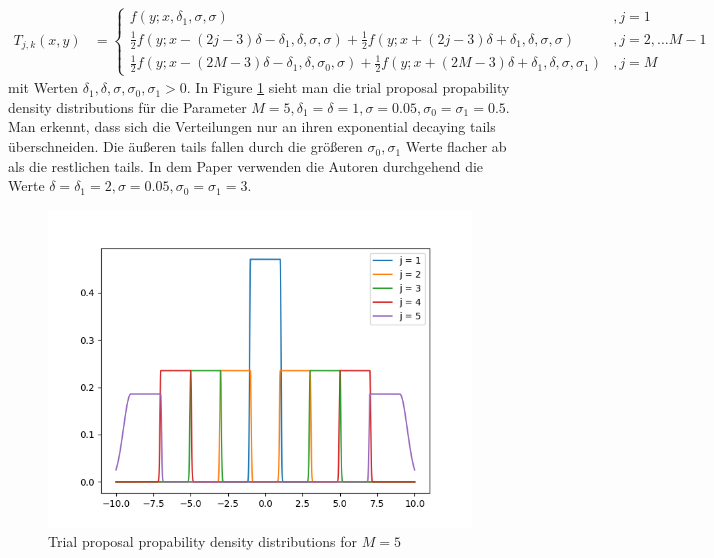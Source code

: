 \documentclass{scrartcl}
\begin{document}
    \begin{align*}
        T_{j,k}(x,y)&=\begin{cases}
                          f(y;x,\delta_1,\sigma,\sigma)&,j=1\\
                          \frac 12 f(y;x-(2j-3)\delta-\delta_1,\delta,\sigma,\sigma)+\frac 12 f(y;x+(2j-3)\delta+\delta_1,\delta,\sigma,\sigma)&,j=2,\dots M-1\\
                          \frac 12 f(y;x-(2M-3)\delta-\delta_1,\delta,\sigma_0,\sigma)+\frac 12 f(y;x+(2M-3)\delta+\delta_1,\delta,\sigma,\sigma_1)&,j=M
        \end{cases}
    \end{align*}
    mit Werten $\delta_1,\delta,\sigma,\sigma_0,\sigma_1>0$. In Figure \ref{trial_proposals}
    sieht man die trial proposal propability density distributions für die Parameter $M=5, \delta_1=\delta=1,\sigma=0.05,\sigma_0=\sigma_1=0.5$. Man erkennt, dass sich die
    Verteilungen nur an ihren exponential decaying tails überschneiden. Die äußeren tails fallen durch die größeren $\sigma_0, \sigma_1$ Werte
    flacher ab als die restlichen tails. In dem Paper \cite{lau2019} verwenden die Autoren durchgehend die Werte $\delta=\delta_1=2,\sigma=0.05,\sigma_0=\sigma_1=3$.

    \begin{figure}
        \centering
        \includegraphics[scale=0.6]{../figs/fig_2b.png}
        \caption{Trial proposal propability density distributions for $M=5$}
        \label{trial_proposals}
    \end{figure}
\end{document}
